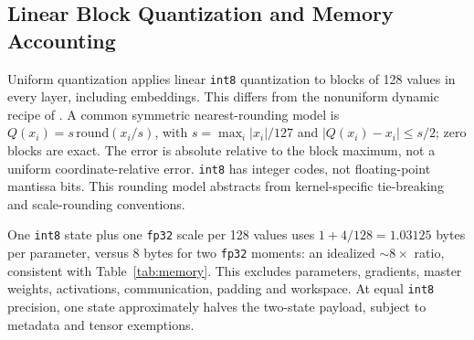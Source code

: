 \documentclass{article}
\begin{document}
\subsection{Linear Block Quantization and Memory Accounting}
Uniform quantization applies linear \texttt{int8} quantization to blocks of 128 values in every layer, including embeddings. This differs from the nonuniform dynamic recipe of \citet{dettmers2022bit}. A common symmetric nearest-rounding model is $Q(x_i)=s\,\mathrm{round}(x_i/s)$, with $s=\max_i|x_i|/127$ and $|Q(x_i)-x_i|\le s/2$; zero blocks are exact. The error is absolute relative to the block maximum, not a uniform coordinate-relative error. \texttt{int8} has integer codes, not floating-point mantissa bits. This rounding model abstracts from kernel-specific tie-breaking and scale-rounding conventions.

One \texttt{int8} state plus one \texttt{fp32} scale per 128 values uses $1+4/128=1.03125$ bytes per parameter, versus 8 bytes for two \texttt{fp32} moments: an idealized $\sim8\times$ ratio, consistent with Table~\ref{tab:memory}. This excludes parameters, gradients, master weights, activations, communication, padding and workspace. At equal \texttt{int8} precision, one state approximately halves the two-state payload, subject to metadata and tensor exemptions.
\end{document}
